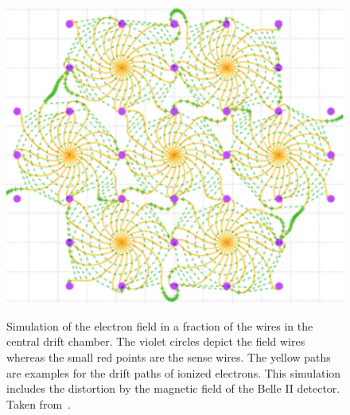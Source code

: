 \begin{figure}
  \caption[Simulation of the electric field in the central drift chamber.]{Simulation of the electron field in a fraction of the wires in the central drift chamber. The violet circles depict the field wires whereas the small red points are the sense wires. The yellow paths are examples for the drift paths of ionized electrons. This simulation includes the distortion by the magnetic field of the Belle II detector. Taken from~\cite{cdc_design}.}
  \includegraphics[width=0.5\linewidth]{figures/experimental_setup/electronsInCDC.pdf}
  \label{fig-sense-wires}
\end{figure}

